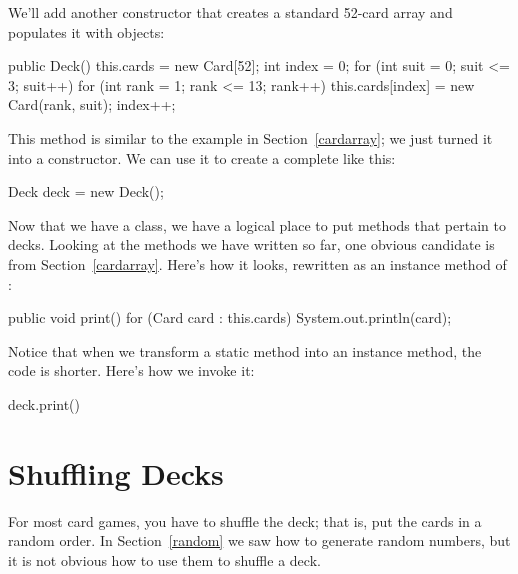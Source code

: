 We'll add another constructor that creates a standard 52-card array and populates it with  objects:

\begin{code}
public Deck() {
    this.cards = new Card[52];
    int index = 0;
    for (int suit = 0; suit <= 3; suit++) {
        for (int rank = 1; rank <= 13; rank++) {
            this.cards[index] = new Card(rank, suit);
            index++;
        }
    }
}
\end{code}

This method is similar to the example in Section~\ref{cardarray}; we just turned it into a constructor.
We can use it to create a complete  like this:

\begin{code}
Deck deck = new Deck();
\end{code}


Now that we have a  class, we have a logical place to put methods that pertain to decks.
Looking at the methods we have written so far, one obvious candidate is  from Section~\ref{cardarray}.
Here's how it looks, rewritten as an instance method of :

\begin{code}
public void print() {
    for (Card card : this.cards) {
        System.out.println(card);
    }
}
\end{code}


Notice that when we transform a static method into an instance method, the code is shorter.
Here's how we invoke it:

\begin{code}
deck.print()
\end{code}


\section{Shuffling Decks}
\label{shuffle}


For most card games, you have to shuffle the deck; that is, put the cards in a random order.
In Section~\ref{random} we saw how to generate random numbers, but it is not obvious how to use them to shuffle a deck.

